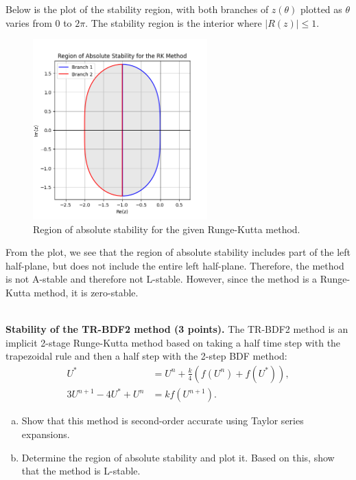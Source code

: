 \documentclass{article}
\begin{document}
Below is the plot of the stability region, with both branches of $z(\theta)$ plotted as $\theta$ varies from $0$ to $2\pi$. The stability region is the interior where $|R(z)| \leq 1$.
\begin{figure}[H]
    \centering
    \includegraphics[width=0.6\textwidth]{Q1.png}
    \caption{Region of absolute stability for the given Runge-Kutta method.}
\end{figure}

\noindent From the plot, we see that the region of absolute stability includes part of the left half-plane, but does not include the entire left half-plane. Therefore, the method is not A-stable and therefore not L-stable. However, since the method is a Runge-Kutta method, it is zero-stable. \\



\begin{problem} \\
    \textbf{Stability of the TR-BDF2 method (3 points).} The TR-BDF2 method is an implicit 2-stage Runge-Kutta method based on taking a half time step with the trapezoidal rule and then a half step with the 2-step BDF method:
    \begin{align*}
        U^{*} &= U^n + \frac{k}{4}\left( f(U^n) + f(U^{*}) \right), \\
        3U^{n+1} - 4U^{*} + U^n &= k f(U^{n+1}).
    \end{align*}
    \begin{enumerate}[(a)]
        \item Show that this method is second-order accurate using Taylor series expansions.
        \item Determine the region of absolute stability and plot it. Based on this, show that the method is L-stable.
    \end{enumerate}
\end{problem}
\end{document}
